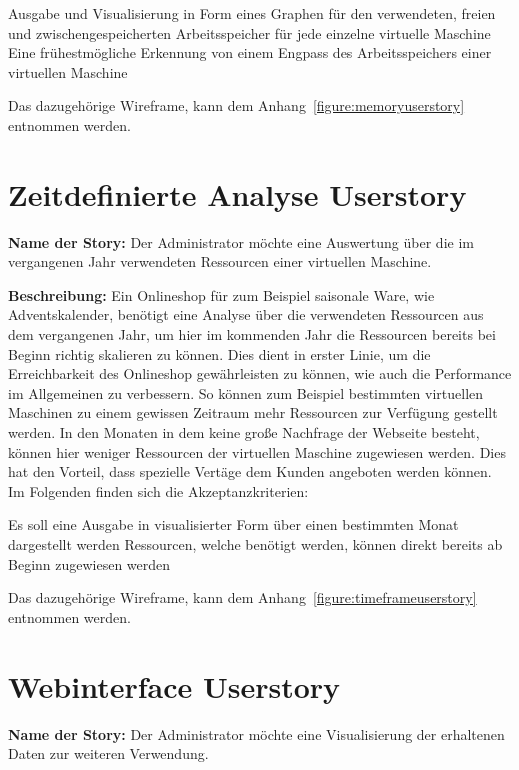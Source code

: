 \begin{outline}
  \1 Ausgabe und Visualisierung in Form eines Graphen für den verwendeten,
  freien und zwischengespeicherten Arbeitsspeicher für jede einzelne virtuelle
  Maschine
  \1 Eine frühestmögliche Erkennung von einem Engpass des Arbeitsspeichers
  einer virtuellen Maschine
\end{outline}

Das dazugehörige Wireframe, kann dem Anhang~\ref{figure:memoryuserstory}
entnommen werden.
\mr%

\section{Zeitdefinierte Analyse Userstory}
\textbf{Name der Story:} Der Administrator möchte eine Auswertung über die im
vergangenen Jahr verwendeten Ressourcen einer virtuellen Maschine.

\textbf{Beschreibung:} Ein Onlineshop für zum Beispiel saisonale Ware, wie
Adventskalender, benötigt eine Analyse über die verwendeten Ressourcen aus dem
vergangenen Jahr, um hier im kommenden Jahr die Ressourcen bereits bei Beginn
richtig skalieren zu können. Dies dient in erster Linie, um die Erreichbarkeit
des Onlineshop gewährleisten zu können, wie auch die Performance im Allgemeinen
zu verbessern. So können zum Beispiel bestimmten virtuellen Maschinen zu einem
gewissen Zeitraum mehr Ressourcen zur Verfügung gestellt werden. In den Monaten
in dem keine große Nachfrage der Webseite besteht, können hier weniger
Ressourcen der virtuellen Maschine zugewiesen werden. Dies hat den Vorteil,
dass spezielle Vertäge dem Kunden angeboten werden können. Im Folgenden finden
sich die Akzeptanzkriterien:

\begin{outline}
  \1 Es soll eine Ausgabe in visualisierter Form über einen bestimmten Monat
  dargestellt werden
  \1 Ressourcen, welche benötigt werden, können direkt bereits ab Beginn
  zugewiesen werden
\end{outline}

Das dazugehörige Wireframe, kann dem Anhang~\ref{figure:timeframeuserstory}
entnommen werden.
\mr%

\section{Webinterface Userstory}
\textbf{Name der Story:} Der Administrator möchte eine Visualisierung der
erhaltenen Daten zur weiteren Verwendung.

